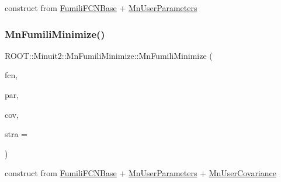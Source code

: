 construct from \mbox{\hyperlink{classROOT_1_1Minuit2_1_1FumiliFCNBase}{Fumili\+F\+C\+N\+Base}} + \mbox{\hyperlink{classROOT_1_1Minuit2_1_1MnUserParameters}{Mn\+User\+Parameters}} 

\mbox{\label{classROOT_1_1Minuit2_1_1MnFumiliMinimize_a3dd4f225ca0cdfdc6eb542ee32667984}} 
\subsubsection{\texorpdfstring{MnFumiliMinimize()}{MnFumiliMinimize()}\hspace{0.1cm}{\footnotesize\ttfamily [12/14]}}
{\footnotesize\ttfamily R\+O\+O\+T\+::\+Minuit2\+::\+Mn\+Fumili\+Minimize\+::\+Mn\+Fumili\+Minimize (\begin{DoxyParamCaption}\item[{const \mbox{\hyperlink{classROOT_1_1Minuit2_1_1FumiliFCNBase}{Fumili\+F\+C\+N\+Base}} \&}]{fcn,  }\item[{const \mbox{\hyperlink{classROOT_1_1Minuit2_1_1MnUserParameters}{Mn\+User\+Parameters}} \&}]{par,  }\item[{const \mbox{\hyperlink{classROOT_1_1Minuit2_1_1MnUserCovariance}{Mn\+User\+Covariance}} \&}]{cov,  }\item[{unsigned int}]{stra = {} }\end{DoxyParamCaption})\hspace{0.3cm}{\ttfamily [inline]}}



construct from \mbox{\hyperlink{classROOT_1_1Minuit2_1_1FumiliFCNBase}{Fumili\+F\+C\+N\+Base}} + \mbox{\hyperlink{classROOT_1_1Minuit2_1_1MnUserParameters}{Mn\+User\+Parameters}} + \mbox{\hyperlink{classROOT_1_1Minuit2_1_1MnUserCovariance}{Mn\+User\+Covariance}} 

\mbox{\label{classROOT_1_1Minuit2_1_1MnFumiliMinimize_ad8292150eb4f2642fb583f0cec00ed7b}} 
